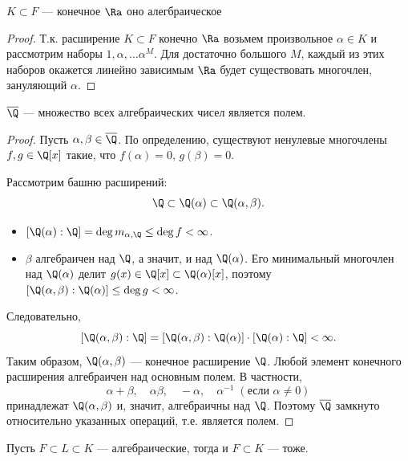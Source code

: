 \begin{proposition}
    \(K \subset F\) --- конечное \(\Ra\) оно алегбраическое
\end{proposition}
\begin{proof}
    Т.к. расширение \(K \subset F\) конечно \(\Ra\) возьмем произвольное \(\alpha \in K\) и рассмотрим наборы \(1, \alpha, \dots \alpha^M\). Для достаточно большого \(M\), каждый из этих наборов окажется линейно зависимым \(\Ra\) будет существовать многочлен, зануляющий \(\alpha\).
\end{proof}

\begin{corollary}
    \(\overline{\Q}\) — множество всех алгебраических чисел является полем.
\end{corollary}
\begin{proof}
    Пусть \(\alpha, \beta \in \overline{\Q}\). По определению, существуют ненулевые многочлены \(f, g \in \Q[x]\) такие, что \(f(\alpha)=0\), \(g(\beta)=0\).

    Рассмотрим башню расширений:
    \[
    \Q \subset \Q(\alpha) \subset \Q(\alpha, \beta).
    \]
    \begin{itemize}
        \item \([\Q(\alpha):\Q] = \deg m_{\alpha,\Q} \le \deg f < \infty\).
        \item \(\beta\) алгебраичен над \(\Q\), а значит, и над \(\Q(\alpha)\). Его минимальный многочлен над \(\Q(\alpha)\) делит \(g(x) \in \Q[x] \subset \Q(\alpha)[x]\), поэтому \([\Q(\alpha,\beta):\Q(\alpha)] \le \deg g < \infty\).
    \end{itemize}
    Следовательно,
    \[
    [\Q(\alpha,\beta):\Q] = [\Q(\alpha,\beta):\Q(\alpha)] \cdot [\Q(\alpha):\Q] < \infty.
    \]
    Таким образом, \(\Q(\alpha,\beta)\) — конечное расширение \(\Q\). Любой элемент конечного расширения алгебраичен над основным полем. В частности,
    \[
    \alpha+\beta,\quad \alpha\beta,\quad -\alpha,\quad \alpha^{-1}\;(\text{если }\alpha\ne0)
    \]
    принадлежат \(\Q(\alpha,\beta)\) и, значит, алгебраичны над \(\Q\). Поэтому \(\overline{\Q}\) замкнуто относительно указанных операций, т.е. является полем.
\end{proof}
\begin{proposition}
    Пусть \(F \subset L \subset K\) --- алгебраические, тогда и \(F \subset K\) --- тоже.
\end{proposition}
